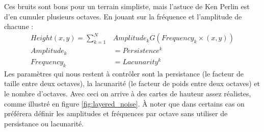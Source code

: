 \documentclass{EPUProjetDi}
\begin{document}
Ces bruits sont bons pour un terrain simpliste, mais l'astuce de Ken Perlin est d'en cumuler plusieurs octaves. En jouant sur la fréquence et l'amplitude de chacune :
\begin{align*}
	Height(x,y) = \sum_{k=1}^{N}&Amplitude_k G(Frequency_k\times(x,y))\\
	Amplitude_k &= Persistence^k\\ 
	Frequency_k &= Lacunarity^k
\end{align*}
Les paramètres qui nous restent à contrôler sont la persistance (le facteur de taille entre deux octaves), la lacunarité (le facteur de poids entre deux octaves) et le nombre d'octaves. Avec ceci on arrive à des cartes de hauteur assez réalistes, comme illustré en figure \ref{fig:layered_noise}. À noter que dans certains cas on préférera définir les amplitudes et fréquences par octave sans utiliser de persistance ou lacunarité.
\end{document}
